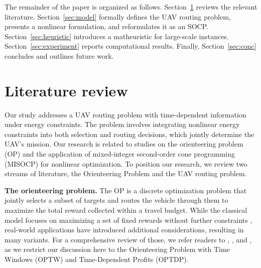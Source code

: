 \documentclass[11pt]{article}
\begin{document}
The remainder of the paper is organized as follows. Section~\ref{sec:lit} reviews the relevant literature. Section~\ref{sec:model} formally defines the UAV routing problem, presents a nonlinear formulation, and reformulates it as an SOCP. Section~\ref{sec:heuristic} introduces a matheuristic for large-scale instances. Section~\ref{sec:experiment} reports computational results. Finally, Section~\ref{sec:conc} concludes and outlines future work.
\section{Literature review}\label{sec:lit}

Our study addresses a UAV routing problem with time-dependent information under energy constraints. The problem involves integrating nonlinear energy constraints into both selection and routing decisions, which jointly determine the UAV’s mission. Our research is related to studies on the orienteering problem (OP) and the application of mixed-integer second-order cone programming (MISOCP) for nonlinear optimization. To position our research, we review two streams of literature, the Orienteering Problem and the UAV routing problem.

\textbf{The orienteering problem. }The OP is a discrete optimization problem that jointly selects a subset of targets and routes the vehicle through them to maximize the total reward collected within a travel budget. While the classical model focuses on maximizing a set of fixed rewards without further constraints \citep{tsiligirides1984heuristic}, real-world applications have introduced additional considerations, resulting in many variants. For a comprehensive review of those, we refer readers to \citep{gavalas2014survey}, \citep{gunawan2016orienteering}, and \citep{vansteenwegen2011orienteering}, as we restrict our discussion here to the Orienteering Problem with Time Windows (OPTW) and Time-Dependent Profits (OPTDP).
\end{document}
